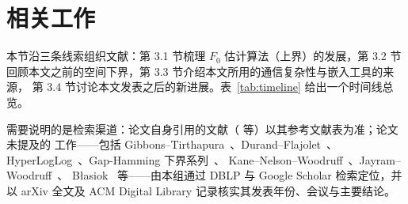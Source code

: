 \documentclass[UTF8, 11pt, a4paper, linestretch=1.15]{ctexart}
\theoremstyle{zhstyle}
\newcommand{\Fzero}{F_0}
\begin{document}
	\section{相关工作}
	
	本节沿三条线索组织文献：第 3.1 节梳理 $\Fzero$ 估计算法（上界）的发展，第 3.2 节
	回顾本文之前的空间下界，第 3.3 节介绍本文所用的通信复杂性与嵌入工具的来源，
	第 3.4 节讨论本文发表之后的新进展。表~\ref{tab:timeline} 给出一个时间线总览。
	
	需要说明的是检索渠道：论文自身引用的文献（\cite{FM85, AMS99, BJKST02, BarYossef02,
		KNR99, BYJKS02, VC71, FLM77, Indyk00, Woo04} 等）以其参考文献表为准；论文未提及的
	工作——包括 Gibbons--Tirthapura~\cite{GT01}、Durand--Flajolet~\cite{DF03}、
	HyperLogLog~\cite{HLL07}、Gap-Hamming 下界系列~\cite{JKS08, BC09, CR11}、
	Kane--Nelson--Woodruff~\cite{KNW10}、Jayram--Woodruff~\cite{JW13}、
	Błasiok~\cite{Bla18} 等——由本组通过 DBLP 与 Google Scholar 检索定位，并以
	arXiv 全文及 ACM Digital Library 记录核实其发表年份、会议与主要结论。
	
\end{document}
